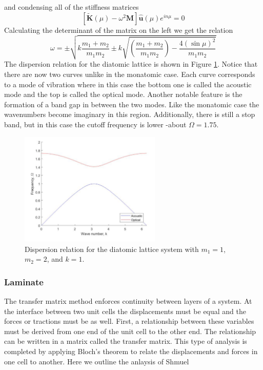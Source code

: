 \documentclass{article}
\begin{document}
and condensing all of the stiffness matrices
\begin{equation}
\left[\mathbf{\tilde{K}}(\mu) -\omega^2 \mathbf{M} \right] 
\mathbf{\hat{u}}(\mu)e^{in\mu} = 0
\end{equation}
Calculating the determinant of the matrix on the left we get the relation
\begin{equation}
\omega =\pm \sqrt{k\frac{m_1+m_2}{m_1m_2} \pm k 
\sqrt{\left(\frac{m_1+m_2}{m_1m_2}\right) - \frac{4(\sin{\mu})^2}{m_1m_2}}}
\end{equation}
The dispersion relation for the diatomic lattice is shown in Figure 
\ref{fig:dia-exact}. Notice that there are now two curves unlike in the 
monatomic case. Each curve corresponds to a mode of vibration where in this 
case the bottom one is called the acoustic mode and the top is called the 
optical mode. Another notable feature is the formation of a band gap in between 
the two modes. Like the monatomic case the wavenumbers become imaginary in this 
region. Additionally, there is still a stop band, but in this case the cutoff 
frequency is lower -about $\Omega = 1.75$.
\begin{figure}[!htbp]
	\centering
	\includegraphics[width=0.6\textwidth]{diatomic-exact.pdf}
	\caption{Dispersion relation for the diatomic lattice system with 
	$m_1=1$, $m_2=2$, and $k=1$.}
	\label{fig:dia-exact}
\end{figure}

\subsubsection{Laminate}
The transfer matrix method enforces continuity between layers of a system. At 
the interface between two unit cells the displacements must be equal and the 
forces or tractions must be as well. First, a relationship between these 
variables must be derived from one end of the unit cell to the other end. The 
relationship can be written in a matrix called the  transfer matrix. This type 
of analysis is completed by applying Bloch's theorem to relate the 
displacements and forces in one cell to another. Here we outline the anlaysis 
of Shmuel \cite{shmuel16}
\end{document}
